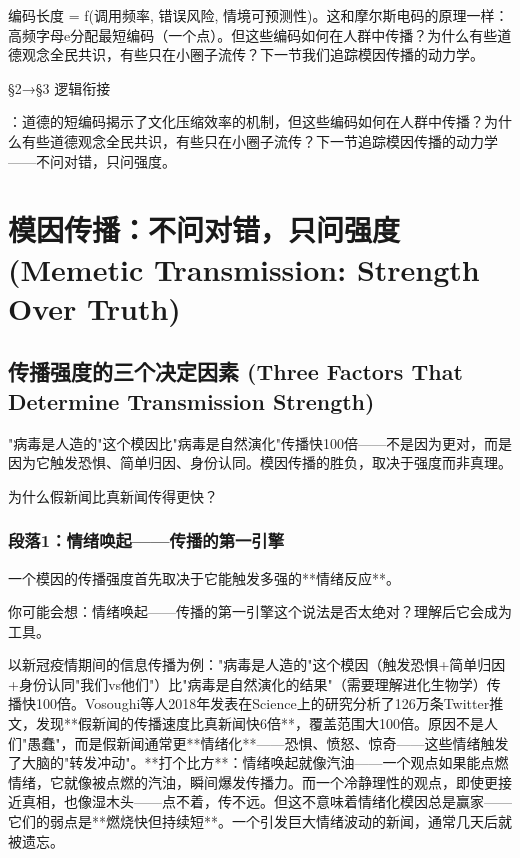 \documentclass[openany, a4paper, 12pt]{book}
\newenvironment{motivation}{
	\vspace{0.5em}
	\begin{tcolorbox}[
		colback=gray!10,           %
		colframe=gray!60,          %
		title=\textit{本章动机 (Motivation)},
		fonttitle=\bfseries,
		arc=0mm,                   %
		leftrule=3mm               %
		]
		\small \itshape %
	}{
	\end{tcolorbox}
	\vspace{1em}
}
\begin{document}
\begin{motivation}
\begin{motivation}
\begin{motivation}
{编码长度 = f(调用频率, 错误风险, 情境可预测性)。这和摩尔斯电码的原理一样：高频字母e分配最短编码（一个点）。但这些编码如何在人群中传播？为什么有些道德观念全民共识，有些只在小圈子流传？下一节我们追踪模因传播的动力学。


	§2→§3 逻辑衔接}：道德的短编码揭示了文化压缩效率的机制，但这些编码如何在人群中传播？为什么有些道德观念全民共识，有些只在小圈子流传？下一节追踪模因传播的动力学——不问对错，只问强度。

	\section{模因传播：不问对错，只问强度 (Memetic Transmission: Strength Over Truth)}

	\subsection{传播强度的三个决定因素 (Three Factors That Determine Transmission Strength)}
	\begin{motivation}
		"病毒是人造的"这个模因比"病毒是自然演化"传播快100倍——不是因为更对，而是因为它触发恐惧、简单归因、身份认同。模因传播的胜负，取决于强度而非真理。
	\end{motivation}
	\begin{questionbox}
		为什么假新闻比真新闻传得更快？
	\end{questionbox}

	\subsubsection*{段落1：情绪唤起——传播的第一引擎}
	一个模因的传播强度首先取决于它能触发多强的**情绪反应**。
	\begin{tcolorbox}[colback=yellow!5, title=\textit{读者行为预测}]
		你可能会想：情绪唤起——传播的第一引擎这个说法是否太绝对？理解后它会成为工具。
	\end{tcolorbox}

以新冠疫情期间的信息传播为例："病毒是人造的"这个模因（触发恐惧+简单归因+身份认同"我们vs他们"）比"病毒是自然演化的结果"（需要理解进化生物学）传播快100倍。Vosoughi等人2018年发表在Science上的研究分析了126万条Twitter推文，发现**假新闻的传播速度比真新闻快6倍**，覆盖范围大100倍。原因不是人们"愚蠢"，而是假新闻通常更**情绪化**——恐惧、愤怒、惊奇——这些情绪触发了大脑的"转发冲动"。**打个比方**：情绪唤起就像汽油——一个观点如果能点燃情绪，它就像被点燃的汽油，瞬间爆发传播力。而一个冷静理性的观点，即使更接近真相，也像湿木头——点不着，传不远。但这不意味着情绪化模因总是赢家——它们的弱点是**燃烧快但持续短**。一个引发巨大情绪波动的新闻，通常几天后就被遗忘。


\end{motivation}
\end{motivation}
\end{motivation}
\end{document}
